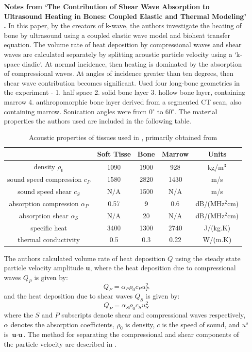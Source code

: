 \documentclass[11pt,titlepage]{article} %
\begin{document}
\textbf{Notes from `The Contribution of Shear Wave Absorption to Ultrasound Heating in Bones: Coupled Elastic and Thermal Modeling' \cite{treeby2015contribution}.}
In this paper, by the creators of k-wave, the authors investigate the heating of bone by ultrasound using a coupled elastic wave model and bioheat transfer equation. The volume rate of heat deposition by compressional waves and shear waves are calculated separately by splitting acoustic particle velocity using a `k-space diadic'. At normal incidence, then heating is dominated by the absorption of compressional waves. At angles of incidence greater than ten degrees, then shear wave contribution becomes significant.
Used four long-bone geometries in the experiment - 1. half space 2. solid bone layer 3. hollow bone layer, containing marrow 4. anthropomorphic bone layer derived from a segmented CT scan, also containing marrow. Sonication angles were from 0$^{\circ}$ to 60$^{\circ}$. The material properties the authors used are included in the following table. 
 \begin{table}[!h]
\begin{center}
  \begin{tabular}{| c | c | c | c | c | }
    \hline
     & Soft Tisse & Bone & Marrow & Units \\ \hline
     density $\rho_0$ & 1090 & 1900 & 928 & kg/m$^3$ \\ 
     sound speed compression $c_P$ & 1580 & 2820 & 1430 & m/s \\ 
     sound speed shear $c_S$ & N/A & 1500 & N/A & m/s \\ 
     absorption compression $\alpha_P$ & 0.57 & 9 & 0.6 & dB/(MHz$^2$cm) \\
     absorption shear $\alpha_S$ & N/A & 20 & N/A & dB/(MHz$^2$cm) \\
	 specific heat & 3400 & 1300 & 2740 & J/(kg.K)\\
	 thermal conductivity & 0.5 & 0.3 & 0.22 & W/(m.K)\\
    \hline
  \end{tabular}
\end{center}
\caption{Acoustic properties of tissues used in \cite{treeby2015contribution}, primarily obtained from  \cite{duck1990physical}}
\end{table}
\linespread{1.0}
The authors calculated volume rate of heat deposition $Q$ using the steady state particle velocity amplitude \textbf{u}, where the heat deposition due to compressional waves $Q_P$ is given by:
\begin{equation}
Q_P = \alpha_P \rho_0 c_P u_P^2
\end{equation}
and the heat deposition due to shear waves $Q_S$ is given by:
\begin{equation}
Q_P = \alpha_S \rho_0 c_S u_S^2
\end{equation}
where the $S$ and $P$ subscripts denote shear and compressional waves respectively, $\alpha$ denotes the absorption coefficients, $\rho_0$ is density, $c$ is the speed of sound, and $u^s$ is $\textbf{u} \cdot \textbf{u}$. The method for separating the compressional and shear components of the particle velocity are described in \cite{treeby2014modeling}.

\newpage

{}

\end{document}
